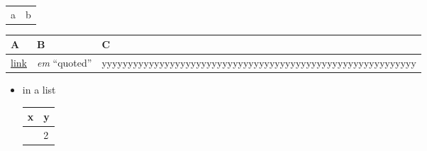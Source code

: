\documentclass[
]{article}
\newcounter{none} %
\begin{document}
{\def\LTcaptype{none} %
\begin{longtable}[]{@{}ll@{}}
\toprule\noalign{}
\endhead
\bottomrule\noalign{}
\endlastfoot
a & b \\
\end{longtable}
}

{\def\LTcaptype{none} %
\begin{longtable}[]{@{}
  >{\raggedright\arraybackslash}p{}
  >{\centering\arraybackslash}p{}
  >{\raggedleft\arraybackslash}p{}@{}}
\toprule\noalign{}
\begin{minipage}[b]{\linewidth}\raggedright
A
\end{minipage} & \begin{minipage}[b]{\linewidth}\centering
B
\end{minipage} & \begin{minipage}[b]{\linewidth}\raggedleft
C
\end{minipage} \\
\midrule\noalign{}
\endhead
\bottomrule\noalign{}
\endlastfoot
\href{http://example.com}{link} & \emph{em} ``quoted'' &
yyyyyyyyyyyyyyyyyyyyyyyyyyyyyyyyyyyyyyyyyyyyyyyyyyyyyyyyyyyy \\
\end{longtable}
}

\begin{itemize}
\item
  in a list

  {\def\LTcaptype{none} %
  \begin{longtable}[]{@{}ll@{}}
  \toprule\noalign{}
  x & y \\
  \midrule\noalign{}
  \endhead
  \bottomrule\noalign{}
  \endlastfoot
  1 & 2 \\
  \end{longtable}
  }
\end{itemize}
\end{document}
